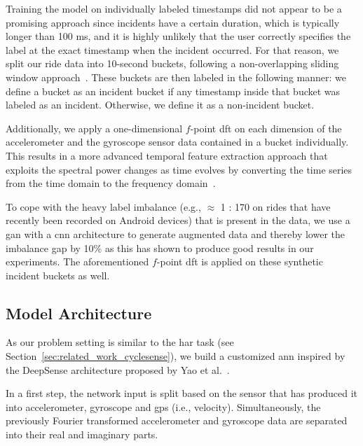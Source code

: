 Training the model on individually labeled timestamps did not appear to be a promising approach since incidents have a certain duration, which is typically longer than 100 ms, and it is highly unlikely that the user correctly specifies the label at the exact timestamp when the incident occurred.
For that reason, we split our ride data into 10-second buckets, following a non-overlapping sliding window approach~\cite{ortiz2011dynamic}.
These buckets are then labeled in the following manner: we define a bucket as an incident bucket if any timestamp inside that bucket was labeled as an incident.
Otherwise, we define it as a non-incident bucket.

Additionally, we apply a one-dimensional $f$-point \ac{dft} on each dimension of the accelerometer and the gyroscope sensor data contained in a bucket individually.
This results in a more advanced temporal feature extraction approach that exploits the spectral power changes as time evolves by converting the time series from the time domain to the frequency domain~\cite{chen2021deep}.


To cope with the heavy label imbalance (e.g., $\approx$ 1 : 170 on rides that have recently been recorded on Android devices) that is present in the data, we use a \ac{gan} with a \ac{cnn} architecture to generate augmented data and thereby lower the imbalance gap by 10\% as this has shown to produce good results in our experiments.
The aforementioned $f$-point \ac{dft} is applied on these synthetic incident buckets as well.

\subsection{Model Architecture}
\label{subsec:model_architecture}
As our problem setting is similar to the \ac{har} task (see Section~\ref{sec:related_work_cyclesense}), we build a customized \ac{ann} inspired by the DeepSense architecture proposed by Yao et al.~\cite{yao2017deepsense}.

In a first step, the network input is split based on the sensor that has produced it into accelerometer, gyroscope and \ac{gps} (i.e., velocity).
Simultaneously, the previously Fourier transformed accelerometer and gyroscope data are separated into their real and imaginary parts.


